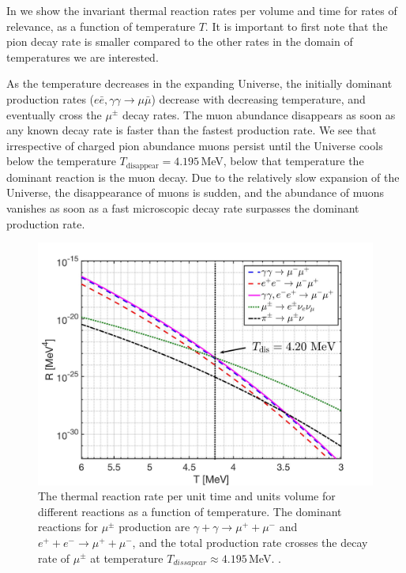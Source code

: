 In  we show the invariant thermal reaction rates per volume and time for rates of relevance, as a function of temperature $T$. It is important to first note that the pion decay rate is smaller compared to the other rates in the domain of temperatures we are interested.

As the temperature decreases in the expanding Universe, the initially dominant production rates ($e\bar e,\gamma\gamma\to\mu\bar\mu$) decrease with decreasing temperature, and eventually cross the $\mu^\pm$ decay rates.  The muon abundance disappears as soon as any known decay rate is faster than the fastest production rate.  We see that irrespective of charged pion  abundance muons persist until the Universe cools below the temperature $T_\mathrm{disappear}=4.195$\,MeV, below that temperature the dominant reaction is the muon decay. Due to the relatively slow expansion of the Universe, the disappearance of muons is sudden, and the abundance of muons vanishes as soon as a fast microscopic decay rate surpasses the dominant production rate.
 
\begin{figure}
\centerline{\includegraphics[width=0.9\linewidth]{./plots/MuonRate_new2.jpg}}
\caption{The thermal reaction rate per unit time and units volume for different reactions as a function of temperature. The dominant reactions for $\mu^\pm$ production are ${\gamma+\gamma\to\mu^++\mu^-}$ and $e^++e^-\to\mu^++\mu^-$, and the total production rate crosses the decay rate of $\mu^\pm$ at temperature $T_{dissapear}\approx 4.195$\,MeV. . }
\label{MuonRatenew:fig} 
\end{figure}


